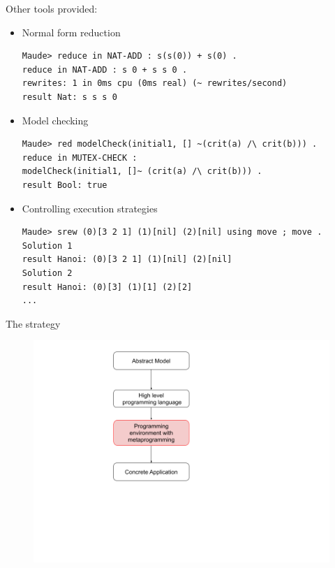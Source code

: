 \documentclass{beamer}
\begin{document}
\begin{frame}[fragile]
    \scriptsize
    Other tools provided:
            \begin{itemize}
            \item Normal form reduction 
\begin{lstlisting}[language=maude]
Maude> reduce in NAT-ADD : s(s(0)) + s(0) .
reduce in NAT-ADD : s 0 + s s 0 .
rewrites: 1 in 0ms cpu (0ms real) (~ rewrites/second)
result Nat: s s s 0
            \end{lstlisting}
            \item Model checking 
            \begin{lstlisting}[language=maude]
Maude> red modelCheck(initial1, [] ~(crit(a) /\ crit(b))) .
reduce in MUTEX-CHECK :
modelCheck(initial1, []~ (crit(a) /\ crit(b))) .
result Bool: true
            \end{lstlisting}
        \item Controlling execution strategies 
        \begin{lstlisting}[language=maude]
Maude> srew (0)[3 2 1] (1)[nil] (2)[nil] using move ; move .
Solution 1
result Hanoi: (0)[3 2 1] (1)[nil] (2)[nil]
Solution 2
result Hanoi: (0)[3] (1)[1] (2)[2]
...
        \end{lstlisting}
        \end{itemize}
   
\end{frame}
\begin{frame}{The strategy}
    \begin{figure}
        \includegraphics[height=\textheight]{img/sec3.png}
    \end{figure}
\end{frame}
\end{document}
